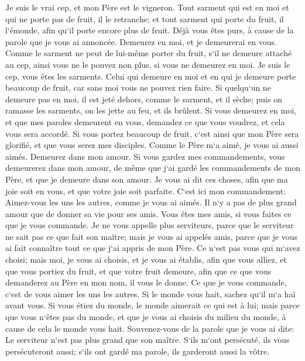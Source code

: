 \verse Je suis le vrai cep, et mon Père est le vigneron. 
\verse Tout sarment qui est en moi et qui ne porte pas de fruit, il le retranche; et tout sarment qui porte du fruit, il l`émonde, afin qu`il porte encore plus de fruit. 
\verse Déjà vous êtes purs, à cause de la parole que je vous ai annoncée. 
\verse Demeurez en moi, et je demeurerai en vous. Comme le sarment ne peut de lui-même porter du fruit, s`il ne demeure attaché au cep, ainsi vous ne le pouvez non plus, si vous ne demeurez en moi. 
\verse Je suis le cep, vous êtes les sarments. Celui qui demeure en moi et en qui je demeure porte beaucoup de fruit, car sans moi vous ne pouvez rien faire. 
\verse Si quelqu`un ne demeure pas en moi, il est jeté dehors, comme le sarment, et il sèche; puis on ramasse les sarments, on les jette au feu, et ils brûlent. 
\verse Si vous demeurez en moi, et que mes paroles demeurent en vous, demandez ce que vous voudrez, et cela vous sera accordé. 
\verse Si vous portez beaucoup de fruit, c`est ainsi que mon Père sera glorifié, et que vous serez mes disciples. 
\verse Comme le Père m`a aimé, je vous ai aussi aimés. Demeurez dans mon amour. 
\verse Si vous gardez mes commandements, vous demeurerez dans mon amour, de même que j`ai gardé les commandements de mon Père, et que je demeure dans son amour. 
\verse Je vous ai dit ces choses, afin que ma joie soit en vous, et que votre joie soit parfaite. 
\verse C`est ici mon commandement: Aimez-vous les uns les autres, comme je vous ai aimés. 
\verse Il n`y a pas de plus grand amour que de donner sa vie pour ses amis. 
\verse Vous êtes mes amis, si vous faites ce que je vous commande. 
\verse Je ne vous appelle plus serviteurs, parce que le serviteur ne sait pas ce que fait son maître; mais je vous ai appelés amis, parce que je vous ai fait connaître tout ce que j`ai appris de mon Père. 
\verse Ce n`est pas vous qui m`avez choisi; mais moi, je vous ai choisis, et je vous ai établis, afin que vous alliez, et que vous portiez du fruit, et que votre fruit demeure, afin que ce que vous demanderez au Père en mon nom, il vous le donne. 
\verse Ce que je vous commande, c`est de vous aimer les uns les autres. 
\verse Si le monde vous hait, sachez qu`il m`a haï avant vous. 
\verse Si vous étiez du monde, le monde aimerait ce qui est à lui; mais parce que vous n`êtes pas du monde, et que je vous ai choisis du milieu du monde, à cause de cela le monde vous hait. 
\verse Souvenez-vous de la parole que je vous ai dite: Le serviteur n`est pas plus grand que son maître. S`ils m`ont persécuté, ils vous persécuteront aussi; s`ils ont gardé ma parole, ils garderont aussi la vôtre. 
